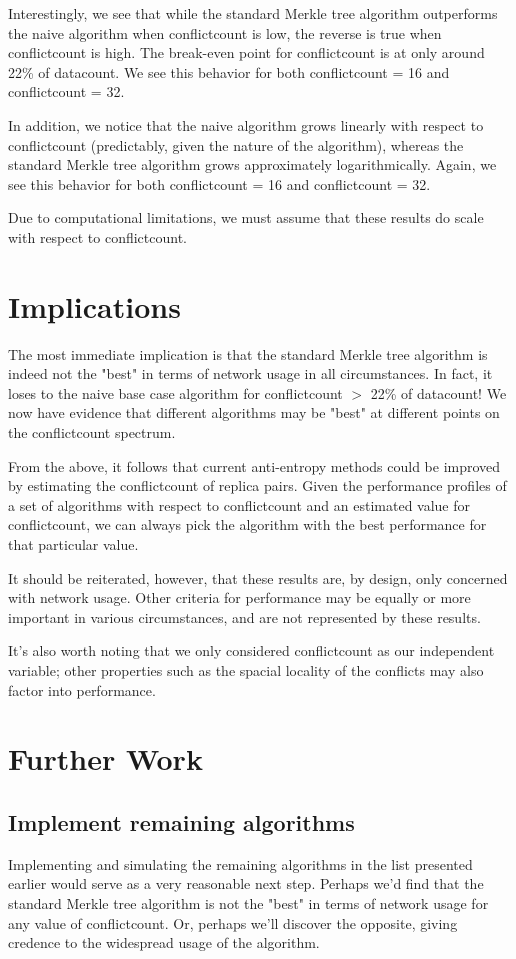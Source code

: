 \documentclass[11pt,letterpaper]{article}
\begin{document}
Interestingly, we see that while the standard Merkle tree algorithm outperforms the naive algorithm when conflictcount is low, the reverse is true when conflictcount is high. The break-even point for conflictcount is at only around 22\% of datacount. We see this behavior for both conflictcount = 16 and conflictcount = 32.

In addition, we notice that the naive algorithm grows linearly with respect to conflictcount (predictably, given the nature of the algorithm), whereas the standard Merkle tree algorithm grows approximately logarithmically. Again, we see this behavior for both conflictcount = 16 and conflictcount = 32.

Due to computational limitations, we must assume that these results do scale with respect to conflictcount.

\section{Implications}
The most immediate implication is that the standard Merkle tree algorithm is indeed not the "best" in terms of network usage in all circumstances. In fact, it loses to the naive base case algorithm for conflictcount $ > $ 22\% of datacount! We now have evidence that different algorithms may be "best" at different points on the conflictcount spectrum.

From the above, it follows that current anti-entropy methods could be improved by estimating the conflictcount of replica pairs. Given the performance profiles of a set of algorithms with respect to conflictcount and an estimated value for conflictcount, we can always pick the algorithm with the best performance for that particular value.

It should be reiterated, however, that these results are, by design, only concerned with network usage. Other criteria for performance may be equally or more important in various circumstances, and are not represented by these results.

It's also worth noting that we only considered conflictcount as our independent variable; other properties such as the spacial locality of the conflicts may also factor into performance.

\section{Further Work}
\subsection{Implement remaining algorithms}
Implementing and simulating the remaining algorithms in the list presented earlier would serve as a very reasonable next step. Perhaps we'd find that the standard Merkle tree algorithm is not the "best" in terms of network usage for any value of conflictcount. Or, perhaps we'll discover the opposite, giving credence to the widespread usage of the algorithm.
\end{document}
